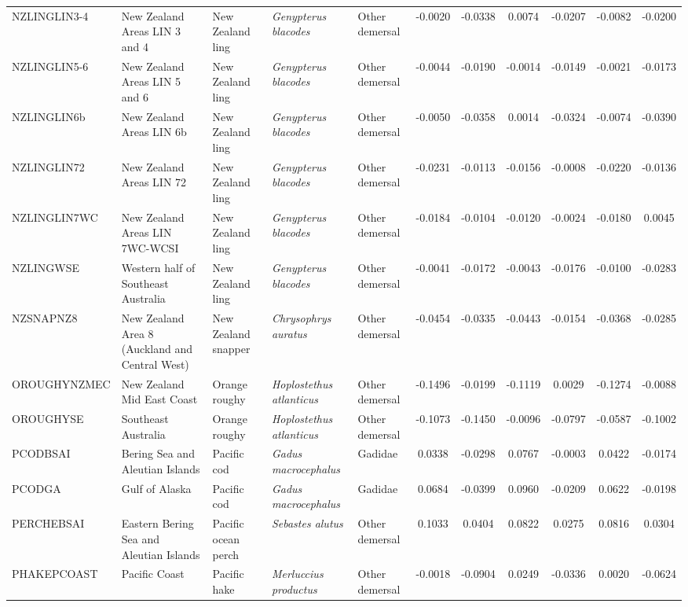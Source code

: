 \begin{longtable}{p{3cm}p{3cm}lllcccccc}
  NZLINGLIN3-4 & New Zealand Areas LIN 3 and 4 & New Zealand ling & \textit{Genypterus blacodes} & Other demersal & -0.0020 & -0.0338 & 0.0074 & -0.0207 & -0.0082 & -0.0200 \\
  NZLINGLIN5-6 & New Zealand Areas LIN 5 and 6 & New Zealand ling & \textit{Genypterus blacodes} & Other demersal & -0.0044 & -0.0190 & -0.0014 & -0.0149 & -0.0021 & -0.0173 \\
  NZLINGLIN6b & New Zealand Areas LIN 6b & New Zealand ling & \textit{Genypterus blacodes} & Other demersal & -0.0050 & -0.0358 & 0.0014 & -0.0324 & -0.0074 & -0.0390 \\
  NZLINGLIN72 & New Zealand Areas LIN 72 & New Zealand ling & \textit{Genypterus blacodes} & Other demersal & -0.0231 & -0.0113 & -0.0156 & -0.0008 & -0.0220 & -0.0136 \\
  NZLINGLIN7WC & New Zealand Areas LIN 7WC-WCSI & New Zealand ling & \textit{Genypterus blacodes} & Other demersal & -0.0184 & -0.0104 & -0.0120 & -0.0024 & -0.0180 & 0.0045 \\
  NZLINGWSE & Western half of Southeast Australia & New Zealand ling & \textit{Genypterus blacodes} & Other demersal & -0.0041 & -0.0172 & -0.0043 & -0.0176 & -0.0100 & -0.0283 \\
  NZSNAPNZ8 & New Zealand Area 8 (Auckland and Central West) & New Zealand snapper & \textit{Chrysophrys auratus} & Other demersal & -0.0454 & -0.0335 & -0.0443 & -0.0154 & -0.0368 & -0.0285 \\
  OROUGHYNZMEC & New Zealand Mid East Coast & Orange roughy & \textit{Hoplostethus atlanticus} & Other demersal & -0.1496 & -0.0199 & -0.1119 & 0.0029 & -0.1274 & -0.0088 \\
  OROUGHYSE & Southeast Australia & Orange roughy & \textit{Hoplostethus atlanticus} & Other demersal & -0.1073 & -0.1450 & -0.0096 & -0.0797 & -0.0587 & -0.1002 \\
  PCODBSAI & Bering Sea and Aleutian Islands & Pacific cod & \textit{Gadus macrocephalus} & Gadidae & 0.0338 & -0.0298 & 0.0767 & -0.0003 & 0.0422 & -0.0174 \\
  PCODGA & Gulf of Alaska & Pacific cod & \textit{Gadus macrocephalus} & Gadidae & 0.0684 & -0.0399 & 0.0960 & -0.0209 & 0.0622 & -0.0198 \\
  PERCHEBSAI & Eastern Bering Sea and Aleutian Islands & Pacific ocean perch & \textit{Sebastes alutus} & Other demersal & 0.1033 & 0.0404 & 0.0822 & 0.0275 & 0.0816 & 0.0304 \\
  PHAKEPCOAST & Pacific Coast & Pacific hake & \textit{Merluccius productus} & Other demersal & -0.0018 & -0.0904 & 0.0249 & -0.0336 & 0.0020 & -0.0624 \\

\end{longtable}
